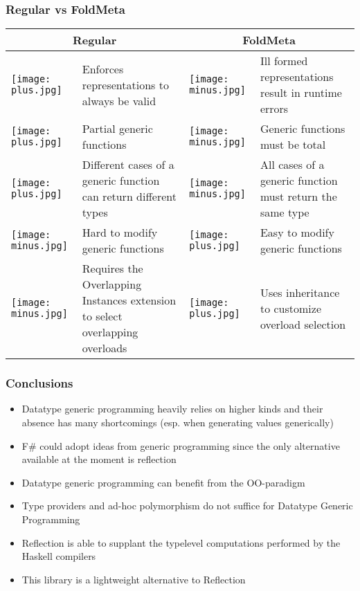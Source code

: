 \documentclass{beamer}
\newcommand{\pos}{

    \texttt{[image: plus.jpg]}
}
\newcommand{\nig}{

  \texttt{[image: minus.jpg]}
}
\begin{document}
\begin{frame}

  \frametitle{Regular vs FoldMeta}

  \begin{tabular}{l p{4cm} l p{4cm}}
    \hline
    \multicolumn{2}{c}{Regular} & \multicolumn{2}{c}{FoldMeta} \\
    \hline

    \pos & Enforces representations to always be valid & \nig & Ill
    formed representations result in runtime errors \\

    \pos & Partial generic functions & \nig & Generic functions must
    be total \\

    \pos & Different cases of a generic function can return different
    types & \nig & All cases of a generic function must return the same type \\

    \nig & Hard to modify generic functions & \pos & Easy to
    modify generic functions \\

    \nig & Requires the Overlapping Instances extension to select
    overlapping overloads & \pos & Uses inheritance to customize
    overload selection \\
    
  \end{tabular}
  
\end{frame}

\begin{frame}
  \frametitle{Conclusions}

  \begin{itemize}

    \item Datatype generic programming heavily relies on higher kinds
      and their absence has many shortcomings (esp. when generating
      values generically)

    \item F\# could adopt ideas from generic programming since the
      only alternative available at the moment is reflection

    \item Datatype generic programming can benefit from the
      OO-paradigm

    \item Type providers and ad-hoc polymorphism do not suffice for
      Datatype Generic Programming

    \item Reflection is able to supplant the typelevel computations
      performed by the Haskell compilers

    \item This library is a lightweight alternative to Reflection
      
  \end{itemize}
  
\end{frame}
\end{document}
